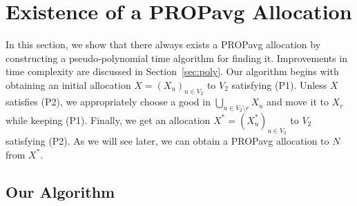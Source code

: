 \documentclass[11pt]{article}
\newcommand{\PROPavg}{\textsf{PROPavg}\xspace}
\begin{document}
\section{Existence of a \PROPavg Allocation}
\label{sec:mainproof}
In this section, we show that there always exists a \PROPavg allocation by constructing a pseudo-polynomial time algorithm for finding it.
Improvements in time complexity are discussed in Section~\ref{sec:poly}.
Our algorithm begins with obtaining an initial allocation ${X}=(X_u)_{u \in V_2}$ to $V_2$ satisfying (P1). %
Unless $X$ satisfies (P2), we appropriately choose a good in $\bigcup_{u \in V_2 \setminus r} X_u$ and move it to $X_r$ while keeping  (P1).
Finally, we get an allocation ${X^*}=(X^*_u)_{u \in V_2}$ to $V_2$ satisfying (P2).
As we will see later, we can obtain a \PROPavg allocation to $N$ from $X^*$. %

\subsection{Our Algorithm}
\end{document}
